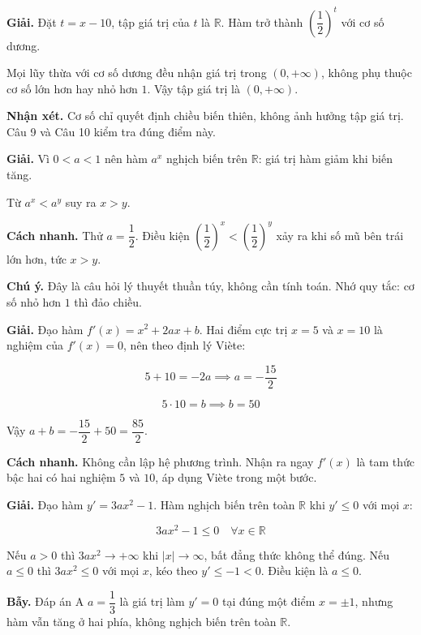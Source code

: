 \documentclass[11pt, a4paper]{article}
\begin{document}
\begin{dapan}[10 — Đáp án B]
\textbf{Giải.} Đặt $t = x - 10$, tập giá trị của $t$ là $\mathbb{R}$. Hàm trở thành $\left(\dfrac{1}{2}\right)^t$ với cơ số dương.

Mọi lũy thừa với cơ số dương đều nhận giá trị trong $(0, +\infty)$, không phụ thuộc cơ số lớn hơn hay nhỏ hơn $1$. Vậy tập giá trị là $(0, +\infty)$.

\textbf{Nhận xét.} Cơ số chỉ quyết định chiều biến thiên, không ảnh hưởng tập giá trị. Câu 9 và Câu 10 kiểm tra đúng điểm này.
\end{dapan}

\begin{dapan}[11 — Đáp án B]
\textbf{Giải.} Vì $0 < a < 1$ nên hàm $a^x$ nghịch biến trên $\mathbb{R}$: giá trị hàm giảm khi biến tăng.

Từ $a^x < a^y$ suy ra $x > y$.

\textbf{Cách nhanh.} Thử $a = \dfrac{1}{2}$. Điều kiện $\left(\dfrac{1}{2}\right)^x < \left(\dfrac{1}{2}\right)^y$ xảy ra khi số mũ bên trái lớn hơn, tức $x > y$.

\textbf{Chú ý.} Đây là câu hỏi lý thuyết thuần túy, không cần tính toán. Nhớ quy tắc: cơ số nhỏ hơn $1$ thì đảo chiều.
\end{dapan}

\begin{dapan}[12 — Đáp án A]
\textbf{Giải.} Đạo hàm $f'(x) = x^2 + 2ax + b$. Hai điểm cực trị $x = 5$ và $x = 10$ là nghiệm của $f'(x) = 0$, nên theo định lý Viète:

$$5 + 10 = -2a \implies a = -\frac{15}{2}$$

$$5 \cdot 10 = b \implies b = 50$$

Vậy $a + b = -\dfrac{15}{2} + 50 = \dfrac{85}{2}$.

\textbf{Cách nhanh.} Không cần lập hệ phương trình. Nhận ra ngay $f'(x)$ là tam thức bậc hai có hai nghiệm $5$ và $10$, áp dụng Viète trong một bước.
\end{dapan}

\begin{dapan}[13 — Đáp án D]
\textbf{Giải.} Đạo hàm $y' = 3ax^2 - 1$. Hàm nghịch biến trên toàn $\mathbb{R}$ khi $y' \le 0$ với mọi $x$:

$$3ax^2 - 1 \le 0 \quad \forall x \in \mathbb{R}$$

Nếu $a > 0$ thì $3ax^2 \to +\infty$ khi $|x| \to \infty$, bất đẳng thức không thể đúng. Nếu $a \le 0$ thì $3ax^2 \le 0$ với mọi $x$, kéo theo $y' \le -1 < 0$. Điều kiện là $a \le 0$.

\textbf{Bẫy.} Đáp án A $a = \dfrac{1}{3}$ là giá trị làm $y' = 0$ tại đúng một điểm $x = \pm 1$, nhưng hàm vẫn tăng ở hai phía, không nghịch biến trên toàn $\mathbb{R}$.
\end{dapan}
\end{document}
